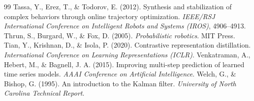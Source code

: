 \documentclass[11pt,a4paper]{article}
\begin{document}
\begin{thebibliography}{99}
 Tassa, Y., Erez, T., \& Todorov, E. (2012). Synthesis and stabilization of complex behaviors through online trajectory optimization. \textit{IEEE/RSJ International Conference on Intelligent Robots and Systems (IROS)}, 4906--4913.
 Thrun, S., Burgard, W., \& Fox, D. (2005). \textit{Probabilistic robotics}. MIT Press.
 Tian, Y., Krishnan, D., \& Isola, P. (2020). Contrastive representation distillation. \textit{International Conference on Learning Representations (ICLR)}.
 Venkatraman, A., Hebert, M., \& Bagnell, J. A. (2015). Improving multi-step prediction of learned time series models. \textit{AAAI Conference on Artificial Intelligence}.
 Welch, G., \& Bishop, G. (1995). An introduction to the Kalman filter. \textit{University of North Carolina Technical Report}.
\end{thebibliography}
\end{document}
